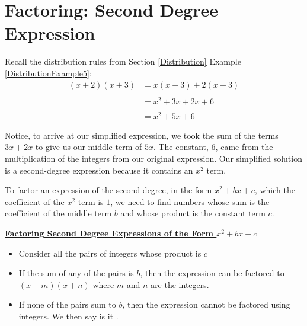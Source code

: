 %
%

\section{Factoring: Second Degree Expression}
\label{SecondDegreeFactor}

Recall the distribution rules from Section \ref{Distribution} Example \ref{DistributionExample5}:
\begin{align*}
	(x+2)(x+3) & = x(x+3)+2(x+3)\\
	& \\
	& = x^2+3x+2x+6\\
	& \\
	& = x^2+5x+6
\end{align*}

Notice, to arrive at our simplified expression, we took the sum of the  terms $3x+2x$ to give us our middle term of $5x$. The constant, $6$, came from the multiplication of the integers from our original expression. Our simplified solution is a second-degree expression because it contains an $x^2$ term.

To factor an expression of the second degree, in the form $x^2+bx+c$, which the coefficient of the $x^2$ term is $1$, we need to find numbers whose sum is the coefficient of the middle term $b$ and whose product is the constant term $c$.

%
%

\begin{definition}
	\textbf{\underline{Factoring Second Degree Expressions of the Form $x^2+bx+c$}}\\
	\bigskip
	\begin{itemize}[leftmargin=*]
		\item Consider all the pairs of integers whose product is $c$
		\item If the sum of any of the pairs is $b$, then the expression can be factored to $(x+m)(x+n)$ where $m$ and $n$ are the integers.
		\item If none of the pairs sum to $b$, then the expression cannot be factored using integers. We then say is it .
	\end{itemize}
	\bigskip
\end{definition}

